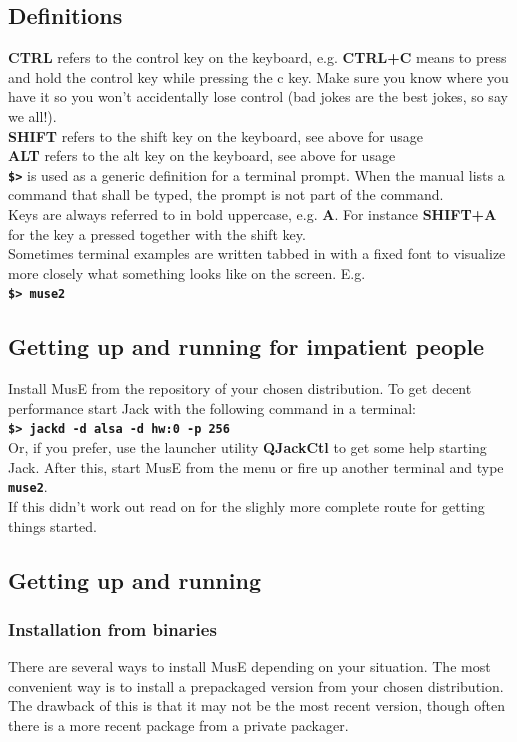 \documentclass[a4paper]{report}
\newcommand{\key}[1]{\textbf{#1}}
\newcommand{\shell}[1]{\texttt{\textbf{#1}}}
\begin{document}
\subsection {Definitions}
\key{CTRL} refers to the control key on the keyboard, e.g. \key{CTRL+C}
means to press and hold the control key while pressing the c key. Make sure
you know where you have it so you won't accidentally lose control
(bad jokes are the best jokes, so say we all!).\\
\key{SHIFT} refers to the shift key on the keyboard, see above for usage\\
\key{ALT} refers to the alt key on the keyboard, see above for usage\\
\shell{\$>} is used as a generic definition for a terminal prompt. When the
manual lists a command that shall be typed, the prompt is not part of the
command.\\
Keys are always referred to in bold uppercase, e.g. \key{A}. For instance
\key{SHIFT+A} for the key a pressed together with the shift key.\\
Sometimes terminal examples are written tabbed in with a fixed font to
visualize more closely what something looks like on the screen.
E.g.\\
\hspace*{1cm}\shell{\$> muse2}\\

\subsection {Getting up and running for impatient people}
Install MusE from the repository of your chosen distribution.
To get decent performance start Jack with the following command in a
terminal:\\
\hspace*{1cm}\shell{\$> jackd -d alsa -d hw:0 -p 256}\\
Or, if you prefer, use the launcher utility \textbf{QJackCtl} to get some
help starting Jack.
After this, start MusE from the menu or fire up another terminal and type
\shell{muse2}.\\
If this didn't work out read on for the slighly more complete route for
getting things started.

\subsection {Getting up and running}
\subsubsection {Installation from binaries}
There are several ways to install MusE depending on your situation. The
most convenient way is to install a prepackaged version from your chosen
distribution. The drawback of this is that it may not be the most recent
version, though often there is a more recent package from a private packager.
\end{document}
